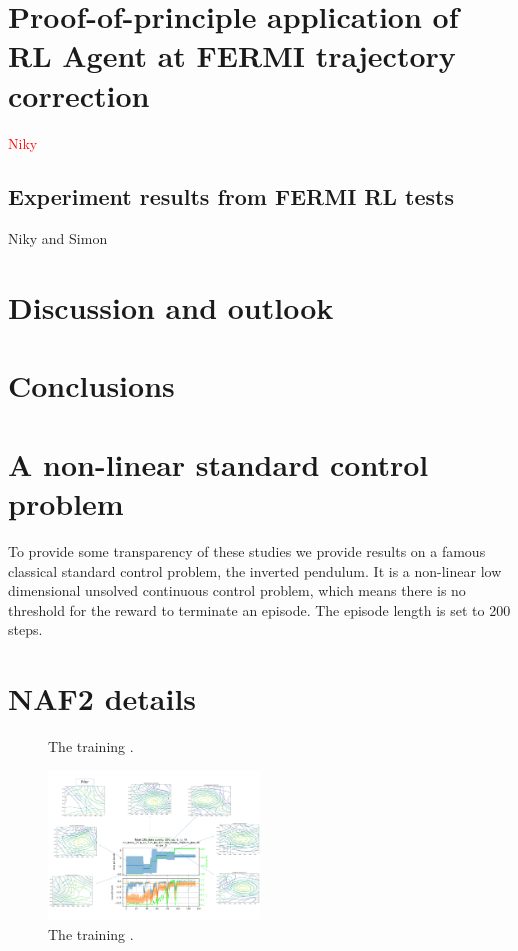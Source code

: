 \documentclass[
 reprint,
 amsmath,amssymb,amsfonts,clevref,
 aps,
prstab,
]{revtex4-2}
\newcommand{\NB}[1]{\textcolor{red}{#1}}
\begin{document}
\section{Proof-of-principle application of RL Agent at FERMI trajectory correction}
\NB{Niky}


\subsection{Experiment results from FERMI RL tests}
Niky and Simon

\section{Discussion and outlook}

\section{Conclusions}


\appendix
\section{A non-linear standard control problem}
To provide some transparency of these studies we provide results on a famous classical standard control problem, the inverted pendulum. It is a non-linear low dimensional unsolved continuous control problem, which means there is no threshold for the reward to terminate an episode. The episode length is set to 200 steps.
\section{NAF2 details}\label{appendix:pernaf}

\begin{figure}[!h]
  \centering
  
  \caption{The training .}
  \label{fig:comparsion_per}
\end{figure}


\begin{figure}[!h]
  \centering
  \includegraphics*[width=0.5\textwidth]{Figures/Learning_evolution}
  \caption{The training .}
  \label{fig:comparsion_per}
\end{figure}
\end{document}
